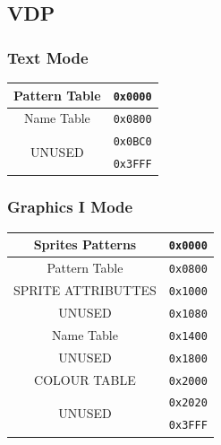 \documentclass[a4paper,11pt]{article}
\begin{document}
    \subsection{VDP}

        \subsubsection{Text Mode}
        \begin{center}
            \begin{tabular}{c r}
                \hline
                Pattern Table           & \texttt{0x0000}\\
                \hline
                Name Table              & \texttt{0x0800}\\
                \hline
                \multirow{2}{*}{UNUSED} & \texttt{0x0BC0}\\
                                        & \texttt{0x3FFF}\\
                \hline
            \end{tabular}
        \end{center}

        \subsubsection{Graphics I Mode}
        \begin{center}
            \begin{tabular}{c r}
                \hline
                Sprites Patterns         & \texttt{0x0000}\\
                \hline
                Pattern Table           & \texttt{0x0800}\\
                \hline
                SPRITE ATTRIBUTTES      & \texttt{0x1000}\\
                \hline
                UNUSED                  & \texttt{0x1080}\\
                \hline
                Name Table              & \texttt{0x1400}\\
                \hline
                UNUSED                  & \texttt{0x1800}\\
                \hline
                COLOUR TABLE            & \texttt{0x2000}\\
                \hline
                \multirow{2}{*}{UNUSED} & \texttt{0x2020}\\
                                        & \texttt{0x3FFF}\\
                \hline
            \end{tabular}
        \end{center}
\end{document}
